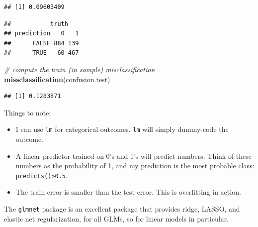\documentclass[]{book}
\newenvironment{Shaded}{\begin{snugshade}}{\end{snugshade}}
\newcommand{\KeywordTok}[1]{\textcolor[rgb]{0.13,0.29,0.53}{\textbf{#1}}}
\newcommand{\DataTypeTok}[1]{\textcolor[rgb]{0.13,0.29,0.53}{#1}}
\newcommand{\DecValTok}[1]{\textcolor[rgb]{0.00,0.00,0.81}{#1}}
\newcommand{\FloatTok}[1]{\textcolor[rgb]{0.00,0.00,0.81}{#1}}
\newcommand{\StringTok}[1]{\textcolor[rgb]{0.31,0.60,0.02}{#1}}
\newcommand{\CommentTok}[1]{\textcolor[rgb]{0.56,0.35,0.01}{\textit{#1}}}
\newcommand{\OperatorTok}[1]{\textcolor[rgb]{0.81,0.36,0.00}{\textbf{#1}}}
\newcommand{\NormalTok}[1]{#1}
\providecommand{\tightlist}{%
  \setlength{\itemsep}{0pt}\setlength{\parskip}{0pt}}
\theoremstyle{definition}
\theoremstyle{definition}
\theoremstyle{definition}
\theoremstyle{remark}
\begin{document}
\begin{verbatim}
## [1] 0.09603409
\end{verbatim}

\begin{Shaded}
\end{Shaded}

\begin{verbatim}
##           truth
## prediction   0   1
##      FALSE 884 139
##      TRUE   60 467
\end{verbatim}

\begin{Shaded}
\begin{Highlighting}[]
\CommentTok{# compute the train (in sample) misclassification}
\KeywordTok{missclassification}\NormalTok{(confusion.test)}
\end{Highlighting}
\end{Shaded}

\begin{verbatim}
## [1] 0.1283871
\end{verbatim}

Things to note:

\begin{itemize}
\tightlist
\item
  I can use \texttt{lm} for categorical outcomes. \texttt{lm} will
  simply dummy-code the outcome.
\item
  A linear predictor trained on 0's and 1's will predict numbers. Think
  of these numbers as the probability of 1, and my prediction is the
  most probable class: \texttt{predicts()\textgreater{}0.5}.
\item
  The train error is smaller than the test error. This is overfitting in
  action.
\end{itemize}

The \texttt{glmnet} package is an excellent package that provides ridge,
LASSO, and elastic net regularization, for all GLMs, so for linear
models in particular.
\end{document}
